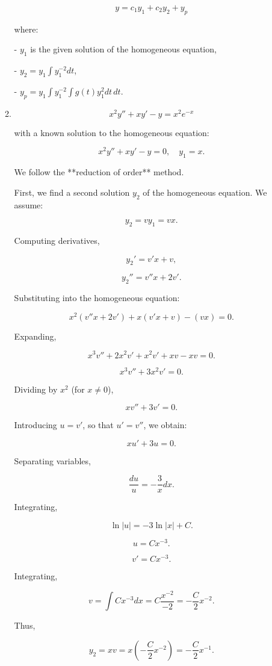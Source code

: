 \documentclass[12pt]{article}
\begin{document}
\begin{enumerate}
\begin{enumerate}
\[
y = c_1 y_1 + c_2 y_2 + y_p
\]

where:

- \( y_1 \) is the given solution of the homogeneous equation,

- \( y_2 = y_1 \int y_1^{-2} dt \),

- \( y_p = y_1 \int y_1^{-2} \int g(t) y_1^2 dt \, dt \).

\item 
\[
x^2 y'' + x y' - y = x^2 e^{-x}
\]

with a known solution to the homogeneous equation:

\[
x^2 y'' + x y' - y = 0, \quad y_1 = x.
\]

We follow the **reduction of order** method.

First, we find a second solution \( y_2 \) of the homogeneous equation.  
We assume:

\[
y_2 = v y_1 = v x.
\]

Computing derivatives,

\[
y_2' = v' x + v,
\]

\[
y_2'' = v'' x + 2 v'.
\]

Substituting into the homogeneous equation:

\[
x^2 (v'' x + 2 v') + x (v' x + v) - (v x) = 0.
\]

Expanding,

\[
x^3 v'' + 2x^2 v' + x^2 v' + x v - x v = 0.
\]

\[
x^3 v'' + 3x^2 v' = 0.
\]

Dividing by \( x^2 \) (for \( x \neq 0 \)),

\[
x v'' + 3 v' = 0.
\]

Introducing \( u = v' \), so that \( u' = v'' \), we obtain:

\[
x u' + 3 u = 0.
\]

Separating variables,

\[
\frac{du}{u} = -\frac{3}{x} dx.
\]

Integrating,

\[
\ln |u| = -3 \ln |x| + C.
\]

\[
u = C x^{-3}.
\]

\[
v' = C x^{-3}.
\]

Integrating,

\[
v = \int C x^{-3} dx = C \frac{x^{-2}}{-2} = -\frac{C}{2} x^{-2}.
\]

Thus,

\[
y_2 = x v = x \left(-\frac{C}{2} x^{-2}\right) = -\frac{C}{2} x^{-1}.
\]


\end{enumerate}
\end{enumerate}
\end{document}
